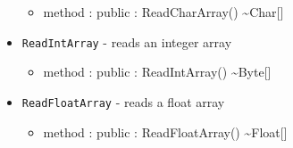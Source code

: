\documentclass[12pt]{article}
\begin{document}
\begin{itemize}
\begin{itemize}
  \item method : public : ReadCharArray() \textasciitilde Char[]
  \end{itemize}
\item \texttt{ReadIntArray} - reads an integer array
  \begin{itemize}
  \item method : public : ReadIntArray() \textasciitilde Byte[]
  \end{itemize}
\item \texttt{ReadFloatArray} - reads a float array
  \begin{itemize}
  \item method : public : ReadFloatArray() \textasciitilde Float[]
  \end{itemize}
\end{itemize}
\end{document}

